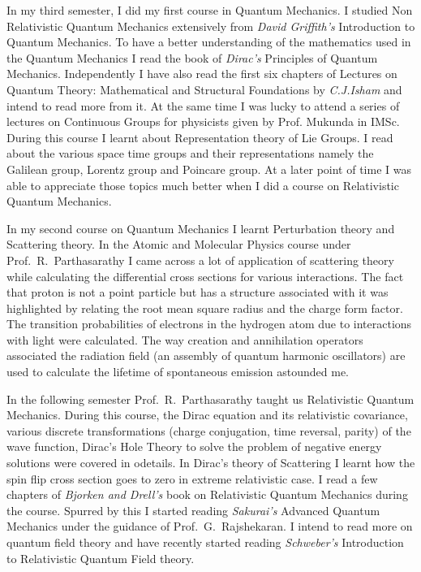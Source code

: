 \documentclass[12pt,a4paper,oneside]{amsart}
\begin{document}
In my third semester, I did my first course in Quantum Mechanics. I studied Non Relativistic Quantum Mechanics extensively from \textit{David Griffith's} Introduction to Quantum Mechanics. To have a better understanding of the mathematics used in the Quantum Mechanics I read the book of \textit{Dirac's} Principles of Quantum Mechanics. Independently I have also read the first six chapters of Lectures on Quantum Theory: Mathematical and Structural Foundations by \textit{C.J.Isham} and intend to read more from it. At the same time I was lucky to attend a series of lectures on Continuous Groups for physicists given by Prof. Mukunda in IMSc. During this course I learnt about Representation theory of Lie Groups. I read about the various space time groups and their representations namely the Galilean group, Lorentz group and Poincare group. At a later point of time I was able to appreciate those topics much better when I did a course on Relativistic Quantum Mechanics.

In my second course on Quantum Mechanics I learnt Perturbation theory and Scattering theory. In the Atomic and Molecular Physics course under Prof.~R.~Parthasarathy I came across a lot of application of scattering theory while calculating the differential cross sections for various interactions. The fact that proton is not a point particle but has a structure associated with it was highlighted by relating the root mean square radius and the charge form factor. The transition probabilities of electrons in the hydrogen atom due to interactions with light were calculated. The way creation and annihilation operators associated the radiation field (an assembly of quantum harmonic oscillators) are used to calculate the lifetime of spontaneous emission astounded me. 

In the following semester Prof.~R.~Parthasarathy taught us Relativistic Quantum Mechanics. During this course, the Dirac equation and its relativistic covariance, various discrete transformations (charge conjugation, time reversal, parity) of the wave function, Dirac's Hole Theory to solve the problem of negative energy solutions were covered in odetails. In Dirac's theory of Scattering I learnt how the spin flip cross section goes to zero in extreme relativistic case. I read a few chapters of \textit{Bjorken and Drell's} book on Relativistic Quantum Mechanics during the course. Spurred by this I started reading \textit{Sakurai's} Advanced Quantum Mechanics under the guidance of Prof.~G.~Rajshekaran. I intend to read more on quantum field theory and have recently started reading \textit{Schweber's} Introduction to Relativistic Quantum Field theory. 
\end{document}
